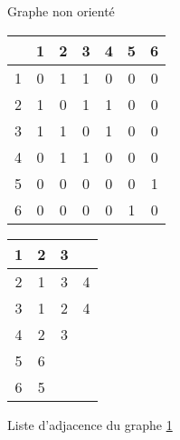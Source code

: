 \begin{figure}[h]
	\centering
	\caption{Graphe non orienté}
	\label{fig:chap1_graph1}
\end{figure}

\begin{figure}[h]
	\begin{minipage}{.5\textwidth}
		\begin{center}
		\begin{tabular}{| c | c | c | c | c | c | c |}
		\hline
		  & 1 & 2 & 3 & 4 & 5 & 6 \\ \hline
		1 & 0 & 1 & 1 & 0 & 0 & 0 \\ \hline
		2 & 1 & 0 & 1 & 1 & 0 & 0 \\ \hline
		3 & 1 & 1 & 0 & 1 & 0 & 0 \\ \hline
		4 & 0 & 1 & 1 & 0 & 0 & 0 \\ \hline
		5 & 0 & 0 & 0 & 0 & 0 & 1 \\ \hline
		6 & 0 & 0 & 0 & 0 & 1 & 0 \\
		\hline
		\end{tabular}
		\end{center}
		\caption{Matrice d'adjacence du graphe \ref{fig:chap1_graph1}}
	\end{minipage}
	\begin{minipage}{.5\textwidth}
		\begin{center}
		\begin{tabular}{| c | c  c  c | }
		\hline
		1 & 2 & 3 & \\ \hline
		2 & 1 & 3 & 4 \\ \hline
		3 & 1 & 2 & 4 \\ \hline
		4 & 2 & 3 & \\ \hline
		5 & 6 & & \\ \hline
		6 & 5 & & \\
		\hline
		\end{tabular}
		\end{center}
		\caption{Liste d'adjacence du graphe \ref{fig:chap1_graph1}}
	\end{minipage}
\end{figure}

